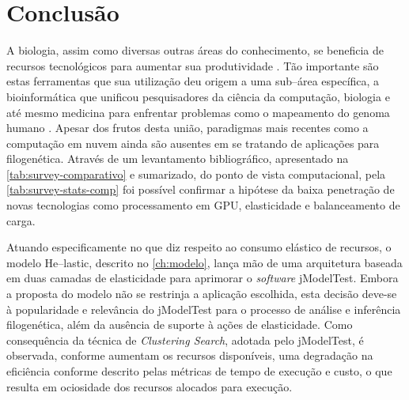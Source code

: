 \documentclass[english,brazilian]{UNISINOSmonografia} %
\begin{document}
\chapter{Conclusão}
\label{ch:conclusao}




A biologia, assim como diversas outras áreas do conhecimento, se beneficia de recursos tecnológicos para aumentar sua produtividade \cite{Denning2009}.
Tão importante são estas ferramentas que sua utilização deu origem a uma sub--área específica, a bioinformática que unificou pesquisadores da ciência da computação, biologia e até mesmo medicina para enfrentar problemas como o mapeamento do genoma humano \cite{Venter2001}.
Apesar dos frutos desta união, paradigmas mais recentes como a computação em nuvem ainda são ausentes em se tratando de aplicações para filogenética.
Através de um levantamento bibliográfico, apresentado na \autoref{tab:survey-comparativo} e sumarizado, do ponto de vista computacional, pela \autoref{tab:survey-stats-comp} foi possível confirmar a hipótese da baixa penetração de novas tecnologias como processamento em GPU, elasticidade e balanceamento de carga.


Atuando especificamente no que diz respeito ao consumo elástico de recursos, o modelo \textsf{He}--lastic, descrito no \autoref{ch:modelo}, lança mão de uma arquitetura baseada em duas camadas de elasticidade para aprimorar o \textit{software} jModelTest.
Embora a proposta do modelo não se restrinja a aplicação escolhida, esta decisão deve-se à popularidade e relevância do jModelTest para o processo de análise e inferência filogenética, além da ausência de suporte à ações de elasticidade.
Como consequência da técnica de \textit{Clustering Search}, adotada pelo jModelTest, é observada, conforme aumentam os recursos disponíveis, uma degradação na eficiência conforme descrito pelas métricas de tempo de execução e custo, o que resulta em ociosidade dos recursos alocados para execução.
\end{document}
